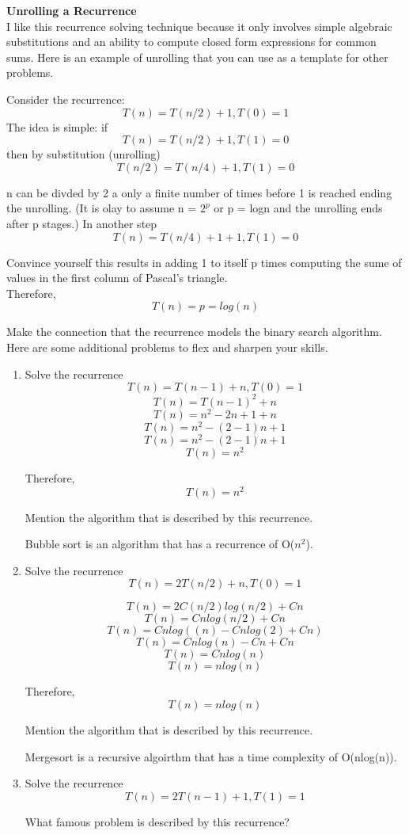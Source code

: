 \documentclass{article}
\begin{document}
\noindent \textbf{Unrolling a Recurrence}\\

\noindent I like this recurrence solving technique because it only involves
simple algebraic substitutions and an ability to compute closed form expressions
for common sums. Here is an example of unrolling that you can use as a template
for other problems.

Consider the recurrence:
\[ T(n) = T(n/2) + 1, T(0) = 1 \]
The idea is simple: if
\[ T(n) = T(n/2) + 1, T(1) = 0 \]
then by substitution (unrolling)
\[ T(n/2) = T(n/4) + 1, T(1) = 0 \]

\noindent n can be divded by 2 a only a finite number of times before 1 is
reached ending the unrolling. (It is olay to assume n = $2^p$ or p = logn and the
unrolling ends after p stages.) In another step
\[ T(n) = T(n/4) + 1 + 1, T(1) = 0 \]

\noindent Convince yourself this results in adding 1 to itself p times computing
the sume of values in the first column of Pascal's triangle.\\
Therefore,
\[ T(n) = p = log(n) \]

\noindent Make the connection that the recurrence models the binary search algorithm.\\
\noindent Here are some additional problems to flex and sharpen your skills.

\begin{enumerate}
    \item Solve the recurrence
            \[ T(n) = T(n-1) + n, T(0) = 1 \]
            \[ T(n) = T(n-1)^2 + n\]
            \[ T(n) = n^2 -2n + 1 + n\]
            \[ T(n) = n^2 - (2-1)n + 1\]
            \[ T(n) = n^2 - (2-1)n + 1\]
            \[T(n) = n^2\]

            Therefore, \[T(n) = n^2\]

            Mention the algorithm that is described by this recurrence.

            Bubble sort is an algorithm that has a recurrence of O($n^2$).
    \item Solve the recurrence
            \[ T(n) = 2T(n/2) + n, T(0) = 1\]
        
            \[ T(n) = 2C(n/2)log(n/2) + Cn \]
            \[ T(n) = Cnlog(n/2) + Cn \]
            \[ T(n) = Cnlog((n) - Cnlog(2) + Cn) \]
            \[ T(n) = Cnlog(n) - Cn + Cn \]
            \[ T(n) = Cnlog(n) \]
            \[ T(n) = nlog(n) \]
            

            Therefore, \\
            \[T(n) = nlog(n)\]

            Mention the algorithm that is described by this recurrence.

            Mergesort is a recursive algoirthm that has a time complexity of O(nlog(n)).
    \item Solve the recurrence
            \[ T(n) = 2T(n-1) + 1, T(1) = 1 \]
            
            What famous problem is described by this recurrence?
\end{enumerate}
\end{document}
